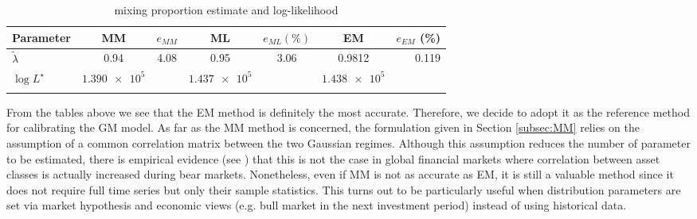 \begin{table}[H]
	\centering
	\begin{tabular}{@{}lcccccr@{}} \toprule
		Parameter & MM & $e_{MM}$ & ML & $e_{ML} (\%)$ & EM & $e_{EM}$ (\%)\\ \midrule
		$\widetilde{\lambda}$  & 0.94  & 4.08 & 0.95 & 3.06 & 0.9812 & 0.119 \\
		\addlinespace[0.5em]
		$\log L^{\star}$ & $\num{1.390e+5}$ & & $\num{1.437e+5}$ & & $\num{1.438e+5}$ & \\ \bottomrule
		\addlinespace[0.5em]
	\end{tabular}
	\caption{mixing proportion estimate and log-likelihood}
	\label{tab:calibration3}
\end{table}
From the tables above we see that the \gls{EM} method is definitely the most accurate. Therefore, we decide to adopt it as the reference method for calibrating the GM model. As far as the MM method is concerned, the formulation given in Section \ref{subsec:MM} relies on the assumption of a common correlation matrix between the two Gaussian regimes. Although this assumption reduces the number of parameter to be estimated, there is empirical evidence (see \cite{Campbell2002}) that this is not the case in global financial markets where correlation between asset classes is actually increased during bear markets. Nonetheless, even if MM is not as accurate as EM, it is still a valuable method since it does not require full time series but only their sample statistics. This turns out to be particularly useful when distribution parameters are set via market hypothesis and economic views (e.g. bull market in the next investment period) instead of using historical data.
